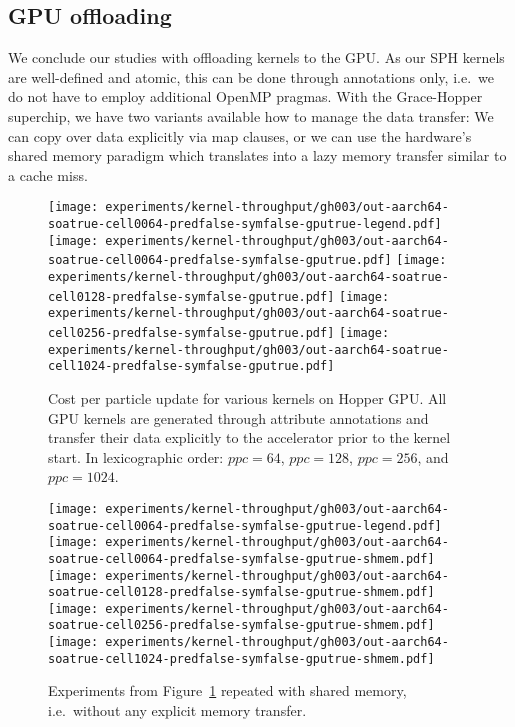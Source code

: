 \subsection{GPU offloading}

We conclude our studies with offloading kernels to the GPU.
As our SPH kernels are well-defined and atomic, this can be done through annotations only, i.e.~we do not have to employ additional OpenMP pragmas.
With the Grace-Hopper superchip, we have two variants available how to manage the data transfer:
We can copy over data explicitly via map clauses, or we can use the hardware's shared memory paradigm which translates into a lazy memory transfer similar to a cache miss.


\begin{figure}[htb]
\centering
    \texttt{[image: experiments/kernel-throughput/gh003/out-aarch64-soatrue-cell0064-predfalse-symfalse-gputrue-legend.pdf]}
    \texttt{[image: experiments/kernel-throughput/gh003/out-aarch64-soatrue-cell0064-predfalse-symfalse-gputrue.pdf]}
    \texttt{[image: experiments/kernel-throughput/gh003/out-aarch64-soatrue-cell0128-predfalse-symfalse-gputrue.pdf]}     
    \texttt{[image: experiments/kernel-throughput/gh003/out-aarch64-soatrue-cell0256-predfalse-symfalse-gputrue.pdf]}     
    \texttt{[image: experiments/kernel-throughput/gh003/out-aarch64-soatrue-cell1024-predfalse-symfalse-gputrue.pdf]}     
  \caption{
   	Cost per particle update for various kernels on Hopper GPU. 
   	All GPU kernels are generated through attribute annotations and transfer their data explicitly to the accelerator prior to the kernel start. 
   	In lexicographic order: $ppc=64$, $ppc=128$, $ppc=256$, and $ppc=1024$.
   \label{figure:results:gpu}
  }
\end{figure}



\begin{figure}[htb]
\centering
    \texttt{[image: experiments/kernel-throughput/gh003/out-aarch64-soatrue-cell0064-predfalse-symfalse-gputrue-legend.pdf]}
    \texttt{[image: experiments/kernel-throughput/gh003/out-aarch64-soatrue-cell0064-predfalse-symfalse-gputrue-shmem.pdf]}
    \texttt{[image: experiments/kernel-throughput/gh003/out-aarch64-soatrue-cell0128-predfalse-symfalse-gputrue-shmem.pdf]}     
    \texttt{[image: experiments/kernel-throughput/gh003/out-aarch64-soatrue-cell0256-predfalse-symfalse-gputrue-shmem.pdf]}     
    \texttt{[image: experiments/kernel-throughput/gh003/out-aarch64-soatrue-cell1024-predfalse-symfalse-gputrue-shmem.pdf]}     
  \caption{
    Experiments from Figure~\ref{figure:results:gpu} repeated with shared memory, i.e.~without any explicit memory transfer.
   \label{figure:results:gpu-shmem}
  }
\end{figure}

